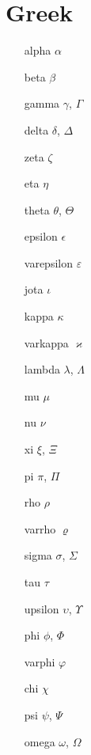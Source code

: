 \documentclass{scrartcl}
\begin{document}
\section{Greek}
\begin{multicols}{3}
\begin{enumerate}[label=\Alph*:]
    \item[alpha] $\alpha$
    \item[beta] $\beta$
    \item[gamma] $\gamma$, $\Gamma$
    \item[delta] $\delta$, $\Delta$
    \item[zeta] $\zeta$
    \item[eta] $\eta$
    \item[theta] $\theta$, $\Theta$
    \item[epsilon] $\epsilon$
    \item[varepsilon] $\varepsilon$
    \item[jota] $\iota$
    \item[kappa] $\kappa$
    \item[varkappa] $\varkappa$
    \item[lambda] $\lambda$, $\Lambda$
    \item[mu] $\mu$
    \item[nu] $\nu$
    \item[xi] $\xi$, $\Xi$
    \item[pi] $\pi$, $\Pi$
    \item[rho] $\rho$
    \item[varrho] $\varrho$
    \item[sigma] $\sigma$, $\Sigma$
    \item[tau] $\tau$
    \item[upsilon] $\upsilon$, $\Upsilon$
    \item[phi] $\phi$, $\Phi$
    \item[varphi] $\varphi$
    \item[chi] $\chi$
    \item[psi] $\psi$, $\Psi$
    \item[omega] $\omega$, $\Omega$
\end{enumerate}
\end{multicols}
\end{document}
